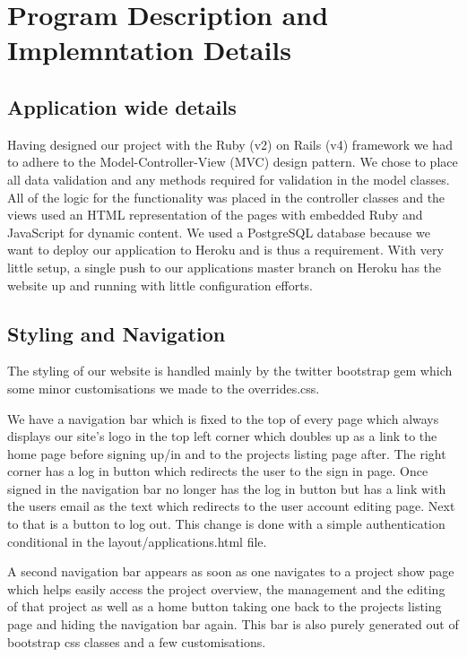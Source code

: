 \documentclass[a4wide, 11pt]{article}
\begin{document}
\clearpage

\section{Program Description and Implemntation Details}
\subsection{Application wide details}
Having designed our project with the Ruby (v2) on Rails (v4) framework we had to adhere to the Model-Controller-View (MVC) design pattern. We chose to place all data validation and any methods required for validation in the model classes. All of the logic for the functionality was placed in the controller classes and the views used an HTML representation of the pages with embedded Ruby and JavaScript for dynamic content. We used a PostgreSQL database because we want to deploy our application to Heroku and is thus a requirement. With very little setup, a single push to our applications master branch on Heroku has the website up and running with little configuration efforts.

\subsection{Styling and Navigation}
The styling of our website is handled mainly by the twitter bootstrap gem which some minor customisations we made to the overrides.css. 

We have a navigation bar which is fixed to the top of every page which always displays our site’s logo in the top left corner which doubles up as a link to the home page before signing up/in and to the projects listing page after. The right corner has a log in button which redirects the user to the sign in page. Once signed in the navigation bar no longer has the log in button but has a link with the users email as the text which redirects to the user account editing page. Next to that is a button to log out. This change is done with a simple authentication conditional in the layout/applications.html file.

A second navigation bar appears as soon as one navigates to a project show page which helps easily access the project overview, the management and the editing of that project as well as a home button taking one back to the projects listing page and hiding the navigation bar again. This bar is also purely generated out of bootstrap css classes and a few customisations.
\end{document}
